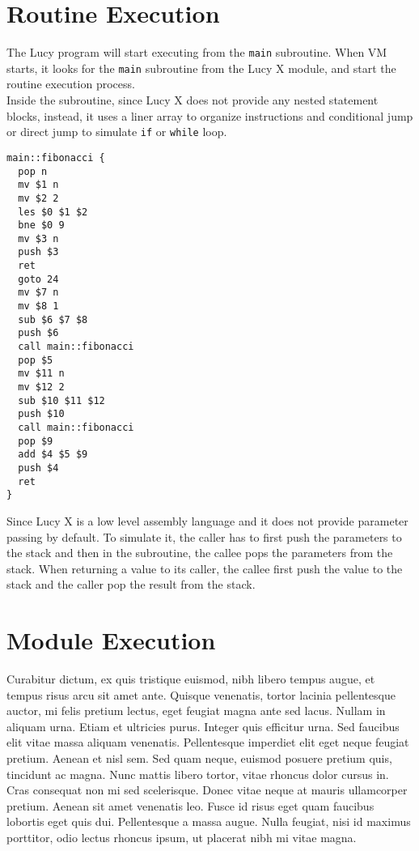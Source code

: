 \section{Routine Execution}
The Lucy program will start executing from the \texttt{main} subroutine. When VM starts, it looks for the \texttt{main} subroutine from the Lucy X module, and start the routine execution process. \\
Inside the subroutine, since Lucy X does not provide any nested statement blocks, instead, it uses a liner array to organize instructions and conditional jump or direct jump to simulate \texttt{if} or \texttt{while} loop.
\begin{lstlisting}[language=LucyX]
main::fibonacci {
  pop n
  mv $1 n
  mv $2 2
  les $0 $1 $2
  bne $0 9
  mv $3 n
  push $3
  ret
  goto 24
  mv $7 n
  mv $8 1
  sub $6 $7 $8
  push $6
  call main::fibonacci
  pop $5
  mv $11 n
  mv $12 2
  sub $10 $11 $12
  push $10
  call main::fibonacci
  pop $9
  add $4 $5 $9
  push $4
  ret
}
\end{lstlisting}
Since Lucy X is a low level assembly language and it does not provide parameter passing by default. To simulate it, the caller has to first push the parameters to the stack and then in the subroutine, the callee pops the parameters from the stack. When returning a value to its caller, the callee first push the value to the stack and the caller pop the result from the stack.

\section{Module Execution}
Curabitur dictum, ex quis tristique euismod, nibh libero tempus augue, et tempus risus arcu sit amet ante. Quisque venenatis, tortor lacinia pellentesque auctor, mi felis pretium lectus, eget feugiat magna ante sed lacus. Nullam in aliquam urna. Etiam et ultricies purus. Integer quis efficitur urna. Sed faucibus elit vitae massa aliquam venenatis. Pellentesque imperdiet elit eget neque feugiat pretium. Aenean et nisl sem. Sed quam neque, euismod posuere pretium quis, tincidunt ac magna. Nunc mattis libero tortor, vitae rhoncus dolor cursus in. Cras consequat non mi sed scelerisque. Donec vitae neque at mauris ullamcorper pretium. Aenean sit amet venenatis leo. Fusce id risus eget quam faucibus lobortis eget quis dui. Pellentesque a massa augue. Nulla feugiat, nisi id maximus porttitor, odio lectus rhoncus ipsum, ut placerat nibh mi vitae magna.
